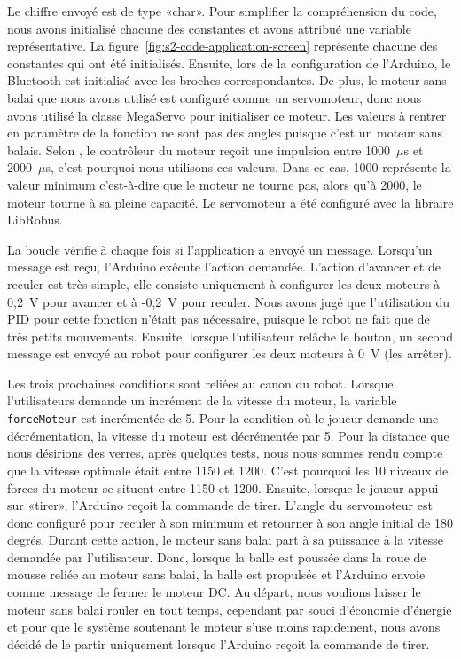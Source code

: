 Le chiffre envoyé est de type «char».
Pour simplifier la compréhension du code, nous avons initialisé chacune des constantes et avons attribué une variable représentative.
La figure~\ref{fig:s2-code-application-screen} représente chacune des constantes qui ont été initialisés.
Ensuite, lors de la configuration de l'Arduino, le Bluetooth est initialisé avec les broches correspondantes.
De plus, le moteur sans balai que nous avons utilisé est configuré comme un servomoteur, donc nous avons utilisé la classe MegaServo pour initialiser ce moteur.
Les valeurs à rentrer en paramètre de la fonction ne sont pas des angles puisque c’est un moteur sans balais.
Selon \cite{arduino_arduino_2019}, le contrôleur du moteur reçoit une impulsion entre 1000~$\mu$s et 2000~$\mu$s, c’est pourquoi nous utilisons ces valeurs.
Dans ce cas, 1000 représente la valeur minimum c’est-à-dire que le moteur ne tourne pas, alors qu’à 2000, le moteur tourne à sa pleine capacité.
Le servomoteur a été configuré avec la libraire LibRobus.

La boucle vérifie à chaque fois si l’application a envoyé un message.
Lorsqu’un message est reçu, l’Arduino exécute l’action demandée.
L’action d’avancer et de reculer est très simple, elle consiste uniquement à configurer les deux moteurs à 0,2~V pour avancer et à -0,2~V pour reculer.
Nous avons jugé que l’utilisation du PID pour cette fonction n’était pas nécessaire, puisque le robot ne fait que de très petits mouvements.
Ensuite, lorsque l’utilisateur relâche le bouton, un second message est envoyé au robot pour configurer les deux moteurs à 0~V (les arrêter).

Les trois prochaines conditions sont reliées au canon du robot.
Lorsque l’utilisateurs demande un incrément de la vitesse du moteur, la variable \texttt{forceMoteur} est incrémentée de 5.
Pour la condition où le joueur demande une décrémentation, la vitesse du moteur est décrémentée par 5.
Pour la distance que nous désirions des verres, après quelques tests, nous nous sommes rendu compte que la vitesse optimale était entre 1150 et 1200.
C’est pourquoi les 10 niveaux de forces du moteur se situent entre 1150 et 1200.
Ensuite, lorsque le joueur appui sur «tirer», l’Arduino reçoit la commande de tirer.
L’angle du servomoteur est donc configuré pour reculer à son minimum et retourner à son angle initial de 180 degrés.
Durant cette action, le moteur sans balai part à sa puissance à la vitesse demandée par l’utilisateur.
Donc, lorsque la balle est poussée dans la roue de mousse reliée au moteur sans balai, la balle est propulsée et l’Arduino envoie comme message de fermer le moteur DC.
Au départ, nous voulions laisser le moteur sans balai rouler en tout temps, cependant par souci d’économie d’énergie et pour que le système soutenant le moteur s’use moins rapidement, nous avons décidé de le partir uniquement lorsque l’Arduino reçoit la commande de tirer.

